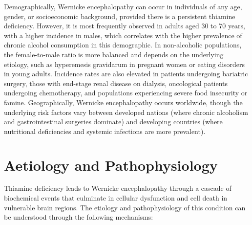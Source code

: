 Demographically, Wernicke encephalopathy can occur in individuals of any age, gender, or socioeconomic background, provided there is a persistent thiamine deficiency. However, it is most frequently observed in adults aged 30 to 70 years, with a higher incidence in males, which correlates with the higher prevalence of chronic alcohol consumption in this demographic. In non-alcoholic populations, the female-to-male ratio is more balanced and depends on the underlying etiology, such as hyperemesis gravidarum in pregnant women or eating disorders in young adults. Incidence rates are also elevated in patients undergoing bariatric surgery, those with end-stage renal disease on dialysis, oncological patients undergoing chemotherapy, and populations experiencing severe food insecurity or famine. Geographically, Wernicke encephalopathy occurs worldwide, though the underlying risk factors vary between developed nations (where chronic alcoholism and gastrointestinal surgeries dominate) and developing countries (where nutritional deficiencies and systemic infections are more prevalent).

\section*{Aetiology and Pathophysiology}
Thiamine deficiency leads to Wernicke encephalopathy through a cascade of biochemical events that culminate in cellular dysfunction and cell death in vulnerable brain regions. The etiology and pathophysiology of this condition can be understood through the following mechanisms:

